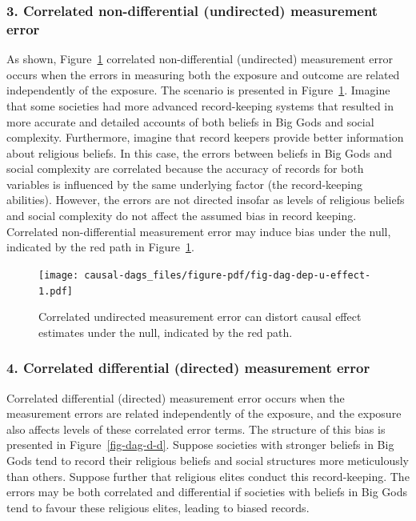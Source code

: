 \documentclass[
  singlecolumn]{article}
\begin{document}
\hypertarget{correlated-non-differential-undirected-measurement-error}{%
\subsubsection{3. Correlated non-differential (undirected) measurement
error}\label{correlated-non-differential-undirected-measurement-error}}

As shown, Figure~\ref{fig-dag-dep-u-effect} correlated non-differential
(undirected) measurement error occurs when the errors in measuring both
the exposure and outcome are related independently of the exposure. The
scenario is presented in Figure~\ref{fig-dag-dep-u-effect}. Imagine that
some societies had more advanced record-keeping systems that resulted in
more accurate and detailed accounts of both beliefs in Big Gods and
social complexity. Furthermore, imagine that record keepers provide
better information about religious beliefs. In this case, the errors
between beliefs in Big Gods and social complexity are correlated because
the accuracy of records for both variables is influenced by the same
underlying factor (the record-keeping abilities). However, the errors
are not directed insofar as levels of religious beliefs and social
complexity do not affect the assumed bias in record keeping. Correlated
non-differential measurement error may induce bias under the null,
indicated by the red path in Figure~\ref{fig-dag-dep-u-effect}.

\begin{figure}

{\centering \texttt{[image: causal-dags\_files/figure-pdf/fig-dag-dep-u-effect-1.pdf]}

}

\caption{\label{fig-dag-dep-u-effect}Correlated undirected measurement
error can distort causal effect estimates under the null, indicated by
the red path.}

\end{figure}

\hypertarget{correlated-differential-directed-measurement-error}{%
\subsubsection{4. Correlated differential (directed) measurement
error}\label{correlated-differential-directed-measurement-error}}

Correlated differential (directed) measurement error occurs when the
measurement errors are related independently of the exposure, and the
exposure also affects levels of these correlated error terms. The
structure of this bias is presented in Figure~\ref{fig-dag-d-d}. Suppose
societies with stronger beliefs in Big Gods tend to record their
religious beliefs and social structures more meticulously than others.
Suppose further that religious elites conduct this record-keeping. The
errors may be both correlated and differential if societies with beliefs
in Big Gods tend to favour these religious elites, leading to biased
records.
\end{document}
